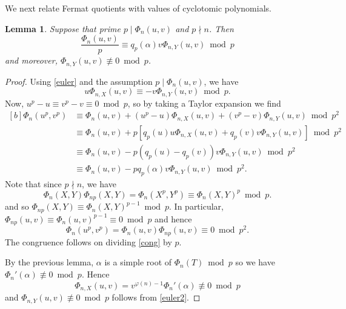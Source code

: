 \documentclass[10pt,a4paper]{amsart}
\newtheorem{lemma}[theorem]{Lemma}
\begin{document}
We next relate Fermat quotients with values of cyclotomic polynomials. 
\begin{lemma}\label{conglem}
Suppose that prime $p\mid\Phi_n(u,v)$ and $p\nmid n$. Then
\[\dfrac{\Phi_{n}(u,v)}{p}\equiv q_p(\alpha)v\Phi_{n,Y}(u,v)\bmod p\] 
and moreover, $\Phi_{n,Y}(u,v)\not\equiv 0\bmod p$.
\end{lemma}
\begin{proof} 
Using \eqref{euler} and the assumption $p\mid\Phi_n(u,v)$, we have
\begin{equation}\label{euler2}
u\Phi_{n,X}(u,v)\equiv -v\Phi_{n,Y}(u,v)\bmod p.
\end{equation}
Now, $u^p-u\equiv v^p-v\equiv 0\bmod p$, so by taking a Taylor expansion we find
\begin{equation}\begin{aligned}[b]
\Phi_n(u^p,v^p) 
&\equiv \Phi_n(u,v)+(u^p-u)\Phi_{n,X}(u,v)+(v^p-v)\Phi_{n,Y}(u,v)\bmod p^2  \\
&\equiv \Phi_n(u,v)+p\left[q_p(u)u\Phi_{n,X}(u,v)+q_p(v)v\Phi_{n,Y}(u,v)\right]\bmod p^2 \\
&\equiv\Phi_n(u,v)-p\left(q_p(u)-q_p(v)\right)v\Phi_{n,Y}(u,v) \bmod p^2 \\
&\equiv\Phi_n(u,v)-pq_p(\alpha)v\Phi_{n,Y}(u,v)\bmod p^2. \label{cong}
\end{aligned}\end{equation}
Note that since $p\nmid n$, we have
\[\Phi_n(X,Y)\Phi_{np}(X,Y)=\Phi_n(X^p,Y^p)\equiv\Phi_n(X,Y)^p\bmod p.\]
and so $\Phi_{np}(X,Y)\equiv\Phi_n(X,Y)^{p-1}\bmod p$. 
In particular, $\Phi_{np}(u,v)\equiv\Phi_{n}(u,v)^{p-1}\equiv 0\bmod p$ and hence 
\[\Phi_n(u^p,v^p)=\Phi_n(u,v)\Phi_{np}(u,v)\equiv 0 \bmod p^2.\]
The congruence follows on dividing \eqref{cong} by $p$.
\medskip

By the previous lemma, $\alpha$ is a simple root of $\Phi_n(T)\bmod p$ so we have $\Phi_n'(\alpha)\not\equiv 0\bmod p$. Hence
\[\Phi_{n,X}(u,v)=v^{\varphi(n)-1}\Phi_n'(\alpha)\not\equiv 0\bmod p\] 
and $\Phi_{n,Y}(u,v)\not\equiv 0\bmod p$ follows from \eqref{euler2}.
\end{proof}
\medskip
\end{document}
